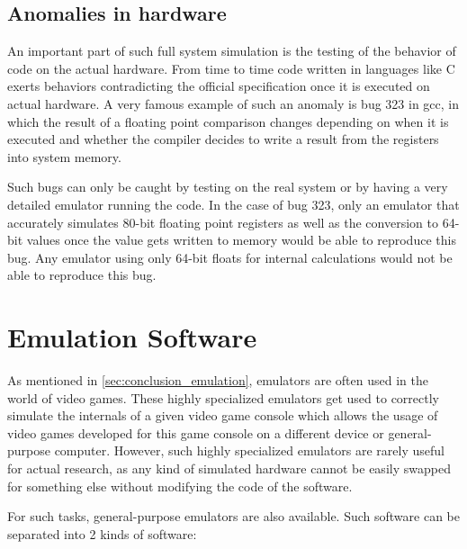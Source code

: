 \subsection{Anomalies in hardware}
An important part of such full system simulation is the testing of the behavior of code on the actual hardware.
From time to time code written in languages like C exerts behaviors contradicting the official specification
once it is executed on actual hardware.
A very famous example of such an anomaly is bug 323\cite{323} in gcc,
in which the result of a floating point comparison changes depending on when it is executed
and whether the compiler decides to write a result from the registers into system memory.

Such bugs can only be caught by testing on the real system
or by having a very detailed emulator running the code.
In the case of bug 323, only an emulator that accurately simulates 80-bit floating point registers
as well as the conversion to 64-bit values once the value gets written to memory
would be able to reproduce this bug.
Any emulator using only 64-bit floats for internal calculations would not be able to reproduce this bug.

\section{Emulation Software}\label{sec:emulators}
As mentioned in \autoref{sec:conclusion_emulation}, emulators are often used in the world of video games.
These highly specialized emulators get used to correctly simulate the internals of a given video game console
which allows the usage of video games developed for this game console on a different device or general-purpose computer.
However, such highly specialized emulators are rarely useful for actual research,
as any kind of simulated hardware cannot be easily swapped for something else without modifying the code of the software.

For such tasks, general-purpose emulators are also available.
Such software can be separated into 2 kinds of software:

